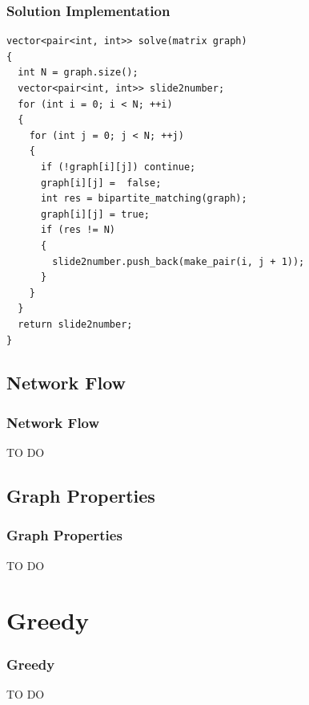 \documentclass{beamer}
\begin{document}
\begin{frame}[containsverbatim]
\frametitle{Solution Implementation}
\scriptsize

\begin{lstlisting}
vector<pair<int, int>> solve(matrix graph)
{
  int N = graph.size();
  vector<pair<int, int>> slide2number;
  for (int i = 0; i < N; ++i)
  {
    for (int j = 0; j < N; ++j)
    {
      if (!graph[i][j]) continue;
      graph[i][j] =  false;
      int res = bipartite_matching(graph);
      graph[i][j] = true;
      if (res != N)
      {
        slide2number.push_back(make_pair(i, j + 1));
      }
    }
  }
  return slide2number;
}
\end{lstlisting}

\end{frame}

\fi


\subsection{Network Flow}

\begin{frame}%
\frametitle{Network Flow}

TO DO

\end{frame}

\subsection{Graph Properties}

\begin{frame}%
\frametitle{Graph Properties}

TO DO

\end{frame}


\section{Greedy}

\begin{frame}%
\frametitle{Greedy}

TO DO

\end{frame}
\end{document}
